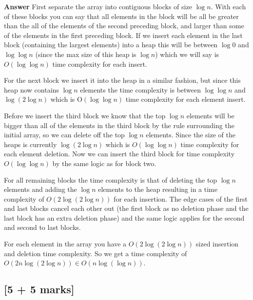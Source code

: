\documentclass[12pt]{article}
\begin{document}
\textbf{Answer} First separate the array into contiguous blocks of size $\log n$. With each of these blocks you can say that all elements in the block will be all be greater than the all of the elements of the second preceding block, and larger than some of the elements in the first preceding block. If we insert each element in the last block (containing the largest elements) into a heap this will be between $\log 0$ and $\log\log n$ (since the max size of this heap is $\log n$) which we will say is $O(\log\log n)$ time complexity for each insert.

For the next block we insert it into the heap in a similar fashion, but since this heap now contains $\log n$ elements the time complexity is between $\log\log n$ and $\log(2\log n)$ which is O$(\log\log n)$ time complexity for each element insert.

Before we insert the third block we know that the top $\log n$ elements will be bigger than all of the elements in the third block by the rule surrounding the initial array, so we can delete off the top $\log n$ elements. Since the size of the heaps is currently $\log(2\log n)$ which is $O(\log\log n)$ time complexity for each element deletion. Now we can insert the third block for time complexity $O(\log\log n)$ by the same logic as for block two.

For all remaining blocks the time complexity is that of deleting the top $\log n$ elements and adding the $\log n$ elements to the heap resulting in a time complexity of $O(2\log(2\log n))$ for each insertion. The edge cases of the first and last blocks cancel each other out (the first block as no deletion phase and the last block has an extra deletion phase) and the same logic applies for the second and second to last blocks.

For each element in the array you have a $O(2\log(2\log n))$ sized insertion and deletion time complexity. So we get a time complexity of $O(2n\log(2\log n)) \in O(n\log(\log n))$.

\subsection{[5 + 5 marks]}
\end{document}
